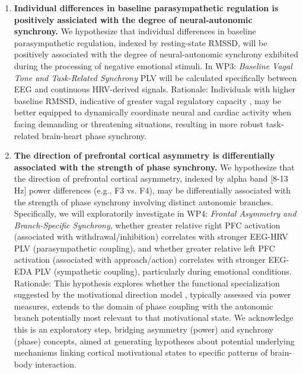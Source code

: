 \documentclass[12pt]{article} %
\begin{document}
\begin{enumerate}[label=(\alph*)]
    \item \textbf{Individual differences in baseline parasympathetic regulation is positively assiciated with the degree of neural-autonomic synchrony.} We hypothesize that individual differences in baseline parasympathetic regulation, indexed by resting-state \gls{RMSSD}, will be positively associated with the degree of neural-autonomic synchrony exhibited during the processing of negative emotional stimuli. In \gls{WP}3: \emph{Baseline Vagal Tone and Task-Related Synchrony} PLV will be calculated specifically between \gls{EEG} and continuous \gls{HRV}-derived signals. Rationale: Individuals with higher baseline \gls{RMSSD}, indicative of greater vagal regulatory capacity \parencite{thayerRelationshipAutonomicImbalance2010, shafferOverviewHeartRate2017}, may be better equipped to dynamically coordinate neural and cardiac activity when facing demanding or threatening situations, resulting in more robust task-related brain-heart phase synchrony.
    \item \textbf{The direction of prefrontal cortical asymmetry is differentially associated with the strength of phase synchrony.} We hypothesize that the direction of prefrontal cortical asymmetry, indexed by alpha band [8-13 Hz] power differences (e.g., F3 vs. F4), may be differentially associated with the strength of phase synchrony involving distinct autonomic branches. Specifically, we will exploratorily investigate in \gls{WP}4: \emph{Frontal Asymmetry and Branch-Specific Synchrony}, whether greater relative right \gls{PFC} activation (associated with withdrawal/inhibition) correlates with stronger \gls{EEG}-\gls{HRV} \gls{PLV} (parasympathetic coupling), and whether greater relative left \gls{PFC} activation (associated with approach/action) correlates with stronger \gls{EEG}-\gls{EDA} \gls{PLV} (sympathetic coupling), particularly during emotional conditions. Rationale: This hypothesis explores whether the functional specialization suggested by the motivational direction model \parencite{davidsonWhatDoesPrefrontal2004, harmon-jonesAngerFrontalBrain1996}, typically assessed via power measures, extends to the domain of phase coupling with the autonomic branch potentially most relevant to that motivational state. We acknowledge this is an exploratory step, bridging asymmetry (power) and synchrony (phase) concepts, aimed at generating hypotheses about potential underlying mechanisms linking cortical motivational states to specific patterns of brain-body interaction.
\end{enumerate}
\end{document}
